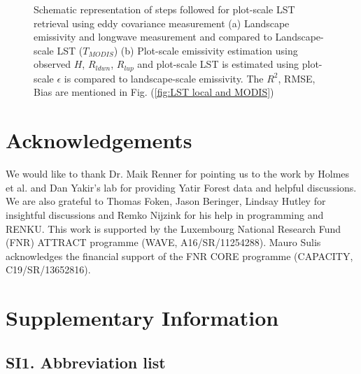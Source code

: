 \documentclass[fleqn,10pt]{wlscirep}
\begin{document}
{{\begin{figure}[h!]
\begin{subfigure}{.5\textwidth}
{}
\end{subfigure}
\caption{Schematic representation of steps followed for plot-scale LST retrieval using eddy covariance measurement (a) Landscape emissivity and longwave measurement and compared to Landscape-scale LST ($T_{MODIS}$) (b) Plot-scale emissivity estimation using observed $H$, $R_{ldwn}$, $R_{lup}$ and plot-scale LST is estimated using plot-scale $\epsilon$ is compared to landscape-scale emissivity. The $R^{2}$, RMSE, Bias are mentioned in Fig. (\ref{fig:LST local and MODIS})}
\label{fig:flow_chart}
\end{figure}





\section{Acknowledgements}
We would like to thank Dr. Maik Renner for pointing us to the work by Holmes et al. and Dan Yakir's lab for providing Yatir Forest data and helpful discussions. We are also grateful to Thomas Foken, Jason Beringer, Lindsay Hutley for insightful discussions and Remko Nijzink for his help in programming and RENKU. This work is supported by the Luxembourg National Research Fund (FNR) ATTRACT programme (WAVE, A16/SR/11254288). Mauro Sulis acknowledges the financial support of the FNR CORE programme (CAPACITY, C19/SR/13652816).


%



%

\section{Supplementary Information}
\subsection*{SI1. Abbreviation list}
\begin{table}[h!]


\end{table}}}
\end{document}
